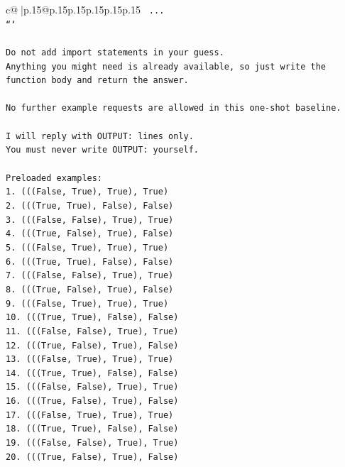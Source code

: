 \documentclass{article}
\begin{document}
{\begin{supertabular}{c@{$\;$}|p{.15\linewidth}@{}p{.15\linewidth}p{.15\linewidth}p{.15\linewidth}p{.15\linewidth}p{.15\linewidth}}
{{{\texttt{    ...} \\
\texttt{```} \\
\\ 
\texttt{Do not add import statements in your guess.} \\
\texttt{Anything you might need is already available, so just write the function body and return the answer.} \\
\\ 
\texttt{No further example requests are allowed in this one{-}shot baseline.} \\
\\ 
\texttt{I will reply with OUTPUT: lines only.} \\
\texttt{You must never write OUTPUT: yourself.} \\
\\ 
\texttt{Preloaded examples:} \\
\texttt{1. (((False, True), True), True)} \\
\texttt{2. (((True, True), False), False)} \\
\texttt{3. (((False, False), True), True)} \\
\texttt{4. (((True, False), True), False)} \\
\texttt{5. (((False, True), True), True)} \\
\texttt{6. (((True, True), False), False)} \\
\texttt{7. (((False, False), True), True)} \\
\texttt{8. (((True, False), True), False)} \\
\texttt{9. (((False, True), True), True)} \\
\texttt{10. (((True, True), False), False)} \\
\texttt{11. (((False, False), True), True)} \\
\texttt{12. (((True, False), True), False)} \\
\texttt{13. (((False, True), True), True)} \\
\texttt{14. (((True, True), False), False)} \\
\texttt{15. (((False, False), True), True)} \\
\texttt{16. (((True, False), True), False)} \\
\texttt{17. (((False, True), True), True)} \\
\texttt{18. (((True, True), False), False)} \\
\texttt{19. (((False, False), True), True)} \\
\texttt{20. (((True, False), True), False)} \\
}}}
\end{supertabular}}
\end{document}
